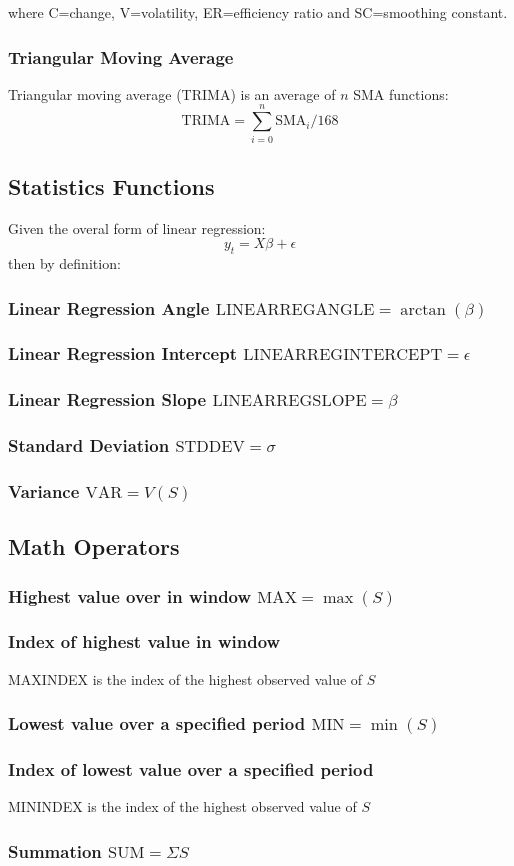where C=change, V=volatility, ER=efficiency ratio and SC=smoothing constant.
\subsubsection{Triangular Moving Average}
Triangular moving average (TRIMA) is an average of $n$ SMA functions:
    \[\text{TRIMA}= \sum_{i=0}^{n} \text{SMA}_{i} / 168 \]
\subsection{Statistics Functions}
Given the overal form of linear regression:
    \[ y_t = X\beta + \epsilon\]
then by definition:
\subsubsection{Linear Regression Angle $\text{LINEARREGANGLE}=\arctan({\beta})$}
\subsubsection{Linear Regression Intercept $\text{LINEARREGINTERCEPT}=\epsilon$}
\subsubsection{Linear Regression Slope $\text{LINEARREGSLOPE}=\beta$}
\subsubsection{Standard Deviation $\text{STDDEV}=\sigma$}
\subsubsection{Variance $\text{VAR}=V(S)$}
\hspace{1cm}
\subsection{Math Operators}
\subsubsection{Highest value over in window $\text{MAX}=\max(S)$} 
\subsubsection{Index of highest value in window}
    MAXINDEX is the index of the highest observed value of $S$
\subsubsection{Lowest value over a specified period $\text{MIN}=\min(S)$}
\subsubsection{Index of lowest value over a specified period}
    MININDEX is the index of the highest observed value of $S$ 
\subsubsection{Summation $\text{SUM}=\Sigma S$}
\pagebreak